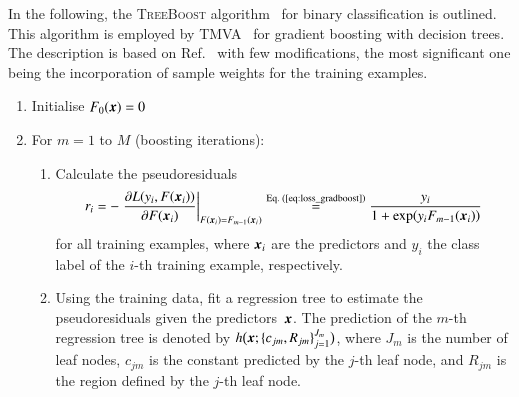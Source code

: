 In the following, the \textsc{TreeBoost} algorithm~\cite{Friedman:2001wbq} for
binary classification is outlined. This algorithm is employed by
\textsc{TMVA}~\cite{TMVA} for gradient boosting with decision trees. The
description is based on Ref.~\cite{Friedman:2001wbq} with few modifications, the
most significant one being the incorporation of sample weights for the training
examples.
\begin{enumerate}
  \setlength{\itemsep}{4pt}

\item Initialise $F_0(\myvec{x}) = 0$

\item For $m = 1$ to $M$ (boosting iterations):
  \begin{enumerate}
    \setlength{\itemsep}{4pt}

  \item Calculate the pseudoresiduals
    \begin{align*}
      r_i
      = - \left. \frac{\partial L(y_i, F(\myvec{x}_i))}{\partial F(\myvec{x}_i)}\right|_{F(\myvec{x}_i) = F_{m - 1}(\myvec{x}_i)}
      \overset{\text{Eq.\ (\ref{eq:loss_gradboost})}}{=} \frac{y_i}{1 + \exp(y_i F_{m-1}(\myvec{x}_i))}
    \end{align*}
    for all training examples, where $\myvec{x}_i$ are the predictors and $y_i$
    the class label of the $i$-th training example, respectively.

  \item Using the training data, fit a regression tree to estimate the
    pseudoresiduals given the predictors~$\myvec{x}$. The prediction of the
    $m$-th regression tree is denoted by
    $h\bigl( \myvec{x}; \{c_{jm}, R_{jm}\}_{j=1}^{J_{m}} \bigr)$, where $J_{m}$
    is the number of leaf nodes, $c_{jm}$ is the constant predicted by the
    $j$-th leaf node, and $R_{jm}$ is the region defined by the $j$-th leaf
    node.


\end{enumerate}
\end{enumerate}
